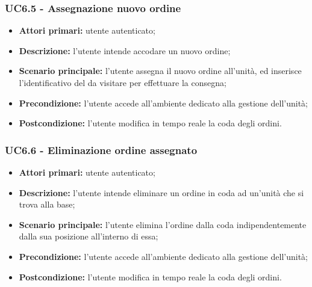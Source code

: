         \subsubsection{UC6.5 - Assegnazione nuovo ordine}
        \begin{itemize}
            \item \textbf{Attori primari:} utente autenticato;
            \item \textbf{Descrizione:} l'utente intende accodare un nuovo ordine;
            \item \textbf{Scenario principale:} l'utente assegna il nuovo ordine all'unità, ed inserisce l'identificativo del  da visitare per effettuare la consegna;
            \item \textbf{Precondizione:} l'utente accede all'ambiente dedicato alla gestione dell'unità;
            \item \textbf{Postcondizione:} l'utente modifica in tempo reale la coda degli ordini.
        \end{itemize}

        \subsubsection{UC6.6 - Eliminazione ordine assegnato}
        \begin{itemize}
            \item \textbf{Attori primari:} utente autenticato;
            \item \textbf{Descrizione:} l'utente intende eliminare un ordine in coda ad un'unità che si trova alla base;
            \item \textbf{Scenario principale:} l'utente elimina l'ordine dalla coda indipendentemente dalla sua posizione all'interno di essa;
            \item \textbf{Precondizione:} l'utente accede all'ambiente dedicato alla gestione dell'unità;
            \item \textbf{Postcondizione:} l'utente modifica in tempo reale la coda degli ordini.
        \end{itemize}

